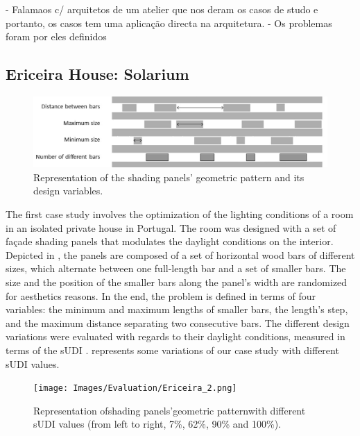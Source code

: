 - Falamaos c/ arquitetos de um atelier que nos deram os casos de studo e portanto, os casos tem uma aplicação directa na arquitetura. 
- Os problemas foram por eles definidos

\subsection{Ericeira House: Solarium}

\begin{figure}
	\centering
	\includegraphics[width=\textwidth]{Images/Evaluation/Ericeira_1.jpg}
	\caption{Representation of the shading panels' geometric pattern and its design variables.}
	\label{fig:ericeira_panels_explanation}
\end{figure}

The first case study involves the optimization of the lighting conditions of a room in an isolated private house in Portugal. The room was designed with a set of façade shading panels that modulates the daylight conditions on the interior. Depicted in , the panels are composed of a set of horizontal wood bars of different sizes, which alternate between one full-length bar and a set of smaller bars. The size and the position of the smaller bars along the panel's width are randomized for aesthetics reasons. In the end, the problem is defined in terms of four variables: the minimum and maximum lengths of smaller bars, the length’s step, and the maximum distance separating two consecutive bars. The different design variations were evaluated with regards to their daylight conditions, measured in terms of the \ac{sUDI} .  represents some variations of our case study with different \ac{sUDI} values.

\begin{figure}
	\centering
	\texttt{[image: Images/Evaluation/Ericeira\_2.png]}
	\caption{Representation ofshading panels’geometric patternwith different sUDI values (from left to right, 7\%, 62\%, 90\% and 100\%).}
	\label{fig:ericeira_multiple_panels}
\end{figure}


